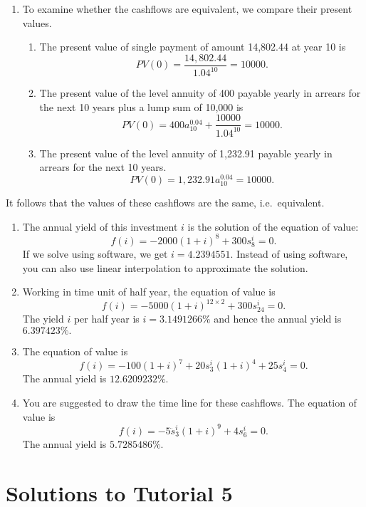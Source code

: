 \documentclass[
]{article}
\theoremstyle{definition}
\theoremstyle{definition}
\theoremstyle{definition}
\theoremstyle{definition}
\theoremstyle{remark}
\begin{document}
\begin{enumerate}
\def\labelenumi{\arabic{enumi}.}
\item
  To examine whether the cashflows are equivalent, we compare their present values.

  \begin{enumerate}
  \def\labelenumii{\alph{enumii}.}
  \item
    The present value of single payment of amount 14,802.44 at year 10 is
    \[ PV(0) =  \frac{14,802.44}{1.04^{10}} = 10000.\]
  \item
    The present value of the level annuity of 400 payable yearly in arrears for the next 10 years plus a lump sum of 10,000 is
    \[ PV(0) =  400 a^{0.04}_{10} +\frac{10000}{1.04^{10}} = 10000.\]
  \item
    The present value of the level annuity of 1,232.91 payable yearly in arrears for the next 10 years.
    \[ PV(0) =  1,232.91 a^{0.04}_{10}  = 10000.\]
  \end{enumerate}
\end{enumerate}

It follows that the values of these cashflows are the same, i.e.~equivalent.

\begin{enumerate}
\def\labelenumi{\arabic{enumi}.}
\setcounter{enumi}{1}
\item
  The annual yield of this investment \(i\) is the solution of the equation of value:
  \[ f(i) = -2000(1+i)^8 +300 s^i_8 = 0. \]
  If we solve using software, we get \(i = 4.2394551%
  \). Instead of using software, you can also use linear interpolation to approximate the solution.
\item
  Working in time unit of half year, the equation of value is
  \[ f(i) = -5000(1+i)^{12 \times 2} + 300 s^i_{24} = 0. \]
  The yield \(i\) per half year is \(i = 3.1491266\%\) and hence the annual yield is \(6.397423\%.\)
\item
  The equation of value is
  \[ f(i) = -100(1+i)^{7} + 20 s^i_{3}(1+i)^{4}  + 25 s^i_{4} = 0. \]
  The annual yield is \(12.6209232\%.\)
\item
  You are suggested to draw the time line for these cashflows. The equation of value is
  \[ f(i) = -5 \ddot{s}^i_{3}(1+i)^{9}   + 4 s^i_{6} = 0. \]
  The annual yield is \(5.7285486\%.\)
\end{enumerate}

\hypertarget{solutions-to-tutorial-5}{%
\section{Solutions to Tutorial 5}\label{solutions-to-tutorial-5}}
\end{document}
